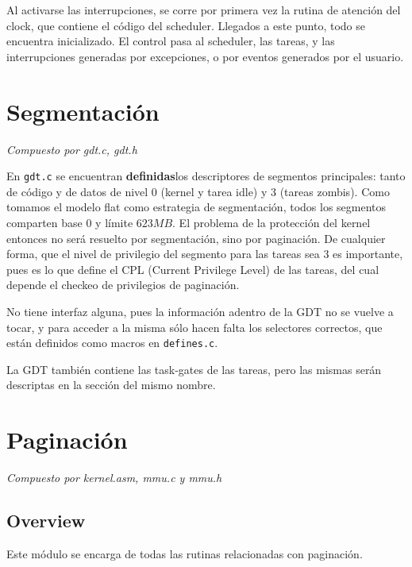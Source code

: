 \documentclass{article}
\begin{document}
	Al activarse las interrupciones, se corre por primera vez la rutina de atención del clock, que contiene el código del scheduler. Llegados a este punto, todo se encuentra inicializado. El control pasa al scheduler, las tareas, y las interrupciones generadas por excepciones, o por eventos generados por el usuario.

	\section{Segmentación}
	\vspace{-1cm}	
	\begin{flushright}
	\textit{Compuesto por gdt.c, gdt.h}
	\end{flushright}
	
	En \texttt{gdt.c} se encuentran \textbf{definidas}los descriptores de segmentos principales: tanto de código y de datos de nivel 0 (kernel y tarea idle) y 3 (tareas zombis). Como tomamos el modelo flat como estrategia de segmentación, todos los segmentos comparten base $0$ y límite $623MB$. El problema de la protección del kernel entonces no será resuelto por segmentación, sino por paginación. De cualquier forma, que el nivel de privilegio del segmento para las tareas sea 3 es importante, pues es lo que define el CPL (Current Privilege Level) de las tareas, del cual depende el checkeo de privilegios de paginación.
	
	No tiene interfaz alguna, pues la información adentro de la GDT no se vuelve a tocar, y para acceder a la misma sólo hacen falta los selectores correctos, que están definidos como macros en \texttt{defines.c}.
	
	La GDT también contiene las task-gates de las tareas, pero las mismas serán descriptas en la sección del mismo nombre.
	
	\section{Paginación}
	\vspace{-1cm}	
	\begin{flushright}
	\textit{Compuesto por kernel.asm, mmu.c y mmu.h}
	\end{flushright}

	\subsection{Overview}
	
	Este módulo se encarga de todas las rutinas relacionadas con paginación.
	
\end{document}
